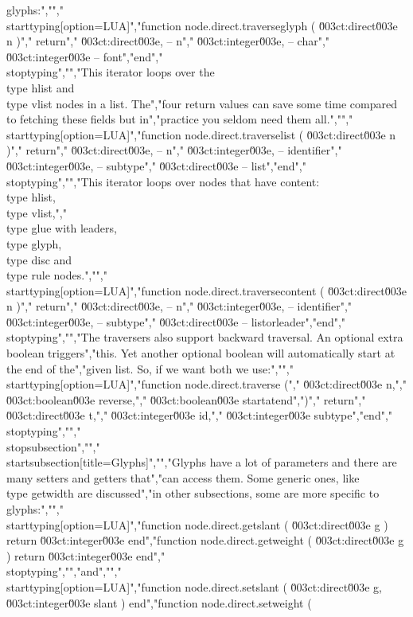 glyphs:","","\\starttyping[option=LUA]","function node.direct.traverseglyph ( \u003ct:direct\u003e n )","    return","        \u003ct:direct\u003e,  -- n","        \u003ct:integer\u003e, -- char","        \u003ct:integer\u003e  -- font","end","\\stoptyping","","This iterator loops over the \\type {hlist} and \\type {vlist} nodes in a list. The","four return values can save some time compared to fetching these fields but in","practice you seldom need them all.","","\\starttyping[option=LUA]","function node.direct.traverselist ( \u003ct:direct\u003e n )","    return","        \u003ct:direct\u003e,  -- n","        \u003ct:integer\u003e, -- identifier","        \u003ct:integer\u003e, -- subtype","        \u003ct:direct\u003e   -- list","end","\\stoptyping","","This iterator loops over nodes that have content: \\type {hlist}, \\type {vlist},","\\type {glue} with leaders, \\type {glyph}, \\type {disc} and \\type {rule} nodes.","","\\starttyping[option=LUA]","function node.direct.traversecontent ( \u003ct:direct\u003e n )","    return","        \u003ct:direct\u003e,  -- n","        \u003ct:integer\u003e, -- identifier","        \u003ct:integer\u003e, -- subtype","        \u003ct:direct\u003e   -- listorleader","end","\\stoptyping","","The traversers also support backward traversal. An optional extra boolean triggers","this. Yet another optional boolean will automatically start at the end of the","given list. So, if we want both we use:","","\\starttyping[option=LUA]","function node.direct.traverse (","    \u003ct:direct\u003e  n,","    \u003ct:boolean\u003e reverse,","    \u003ct:boolean\u003e startatend",")","    return","        \u003ct:direct\u003e  t,","        \u003ct:integer\u003e id,","        \u003ct:integer\u003e subtype","end","\\stoptyping","","\\stopsubsection","","\\startsubsection[title={Glyphs}]","","Glyphs have a lot of parameters and there are many setters and getters that","can access them. Some generic ones, like \\type {getwidth} are discussed","in other subsections, some are more specific to glyphs:","","\\starttyping[option=LUA]","function node.direct.getslant  ( \u003ct:direct\u003e g ) return \u003ct:integer\u003e end","function node.direct.getweight ( \u003ct:direct\u003e g ) return \u003ct:integer\u003e end","\\stoptyping","","and","","\\starttyping[option=LUA]","function node.direct.setslant  ( \u003ct:direct\u003e g, \u003ct:integer\u003e slant  ) end","function node.direct.setweight ( 